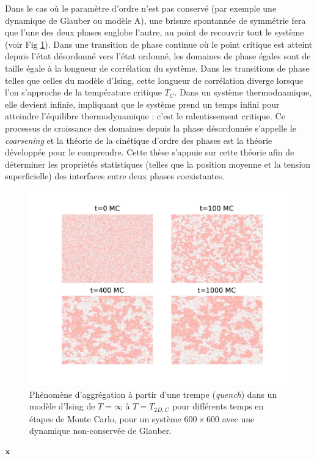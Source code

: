 Dans le cas où le paramètre d'ordre n'est pas conservé (par exemple une dynamique de Glauber ou modèle A), une brisure spontannée de symmétrie fera que l'une des deux phases englobe l'autre, au point de recouvrir tout le système (voir Fig \ref{clusterization}). Dans une transition de phase continue où le point critique est atteint depuis l'état désordonné vers l'état ordonné, les domaines de phase égales sont de taille égale à la longueur de corrélation du système. Dans les transitions de phase telles que celles du modèle d'Ising, cette longueur de corrélation diverge lorsque l'on s'approche de la température critique $T_C$. Dans un système thermodnamique, elle devient infinie, impliquant que le système prend un temps infini pour atteindre l'équilibre thermodynamique : c'est le ralentissement critique. Ce processus de croissance des domaines depuis la phase désordonnée s'appelle le \textit{coarsening} et la théorie de la cinétique d'ordre des phases est la théorie développée pour le comprendre.
Cette thèse s'appuie sur cette théorie afin de déterminer les propriétés statistiques (telles que la position moyenne et la tension superficielle) des interfaces entre deux phases coexistantes.
\begin{figure}[t]
    \centering
    \includegraphics[width=0.9\linewidth]{intro/clusterization.pdf}
    \caption{Phénomène d'aggrégation à partir d'une trempe (\textit{quench}) dans un modèle d'Ising de $T=\infty$ à $T=T_{2D,C}$ \cite{onsager_crystal_1944} pour différents temps en étapes de Monte Carlo, pour un système $600 \times 600$ avec une dynamique non-conservée de Glauber.}
    \label{clusterization}
\end{figure}
${\bf x}$

